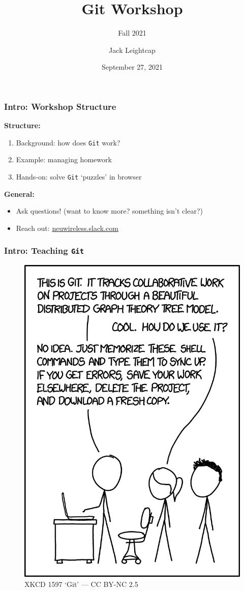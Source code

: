 \documentclass{beamer} \usetheme{Madrid}
\title{Git Workshop}
\subtitle{Fall 2021}
\author[]{Jack Leightcap\inst{1}\inst{2}}
\institute[IEEE, Wireless Club]{
	\inst{1}IEEE -- \url{nuieeeofficers@gmail.com}
	\and
	\inst{2}Wireless Club -- \url{nuwirelessclub@gmail.com}
}
\date[Fall 2021]{September 27, 2021}
\begin{document}
\frame{\titlepage}

\begin{frame}
	\frametitle{Intro: Workshop Structure}
	\centering \textbf{Structure:}
	\begin{enumerate}
		\setlength\itemsep{1em}
		\item Background: how does \texttt{Git} work?
		\item Example: managing homework
		\item Hands-on: solve \texttt{Git} `puzzles' in browser
	\end{enumerate}
	\vfill
	\centering \textbf{General:}
	\begin{itemize}
		\setlength\itemsep{1em}
		\item Ask questions!
		      (want to know more? something isn't clear?)
		\item Reach out: \url{neuwireless.slack.com}
	\end{itemize}
\end{frame}

\begin{frame}
	\frametitle{Intro: Teaching \texttt{Git}}
	\begin{figure}
		\includegraphics[height=\textheight-25mm]{xkcd.png}
		\caption{XKCD 1597 `Git' --- CC BY-NC 2.5}
	\end{figure}
\end{frame}
\end{document}
